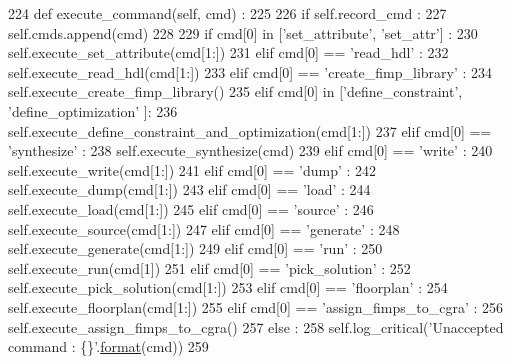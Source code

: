 \begin{DoxyCode}
224   \textcolor{keyword}{def }execute\_command(self, cmd) :
225 
226     \textcolor{keywordflow}{if} self.record\_cmd :
227       self.cmds.append(cmd)
228 
229     \textcolor{keywordflow}{if} cmd[0] \textcolor{keywordflow}{in} [\textcolor{stringliteral}{'set\_attribute'}, \textcolor{stringliteral}{'set\_attr'}] :
230       self.execute\_set\_attribute(cmd[1:])
231     \textcolor{keywordflow}{elif} cmd[0] == \textcolor{stringliteral}{'read\_hdl'} :
232       self.execute\_read\_hdl(cmd[1:])
233     \textcolor{keywordflow}{elif} cmd[0] == \textcolor{stringliteral}{'create\_fimp\_library'} :
234       self.execute\_create\_fimp\_library()
235     \textcolor{keywordflow}{elif} cmd[0] \textcolor{keywordflow}{in} [\textcolor{stringliteral}{'define\_constraint'}, \textcolor{stringliteral}{'define\_optimization'} ]:
236       self.execute\_define\_constraint\_and\_optimization(cmd[1:])
237     \textcolor{keywordflow}{elif} cmd[0] == \textcolor{stringliteral}{'synthesize'} :
238       self.execute\_synthesize(cmd)
239     \textcolor{keywordflow}{elif} cmd[0] == \textcolor{stringliteral}{'write'} :
240       self.execute\_write(cmd[1:])
241     \textcolor{keywordflow}{elif} cmd[0] == \textcolor{stringliteral}{'dump'} :
242       self.execute\_dump(cmd[1:])
243     \textcolor{keywordflow}{elif} cmd[0] == \textcolor{stringliteral}{'load'} :
244       self.execute\_load(cmd[1:])
245     \textcolor{keywordflow}{elif} cmd[0] == \textcolor{stringliteral}{'source'} :
246       self.execute\_source(cmd[1:])
247     \textcolor{keywordflow}{elif} cmd[0] == \textcolor{stringliteral}{'generate'} :
248       self.execute\_generate(cmd[1:])
249     \textcolor{keywordflow}{elif} cmd[0] == \textcolor{stringliteral}{'run'} :
250       self.execute\_run(cmd[1])
251     \textcolor{keywordflow}{elif} cmd[0] == \textcolor{stringliteral}{'pick\_solution'} :
252       self.execute\_pick\_solution(cmd[1:])
253     \textcolor{keywordflow}{elif} cmd[0] == \textcolor{stringliteral}{'floorplan'} :
254       self.execute\_floorplan(cmd[1:])
255     \textcolor{keywordflow}{elif} cmd[0] == \textcolor{stringliteral}{'assign\_fimps\_to\_cgra'} :
256       self.execute\_assign\_fimps\_to\_cgra()
257     \textcolor{keywordflow}{else} :
258       self.log\_critical(\textcolor{stringliteral}{'Unaccepted command : \{\}'}.\hyperlink{namespacesylva_1_1examples_1_1hsdfg_ab3510a0b8457362330aa4d9fd2209590}{format}(cmd))
259 
\end{DoxyCode}
\mbox{\label{classsylva_1_1misc_1_1exec_1_1_s_y_l_v_a_a8a4492e65ade4e43b53de96f2201bc27}} 
